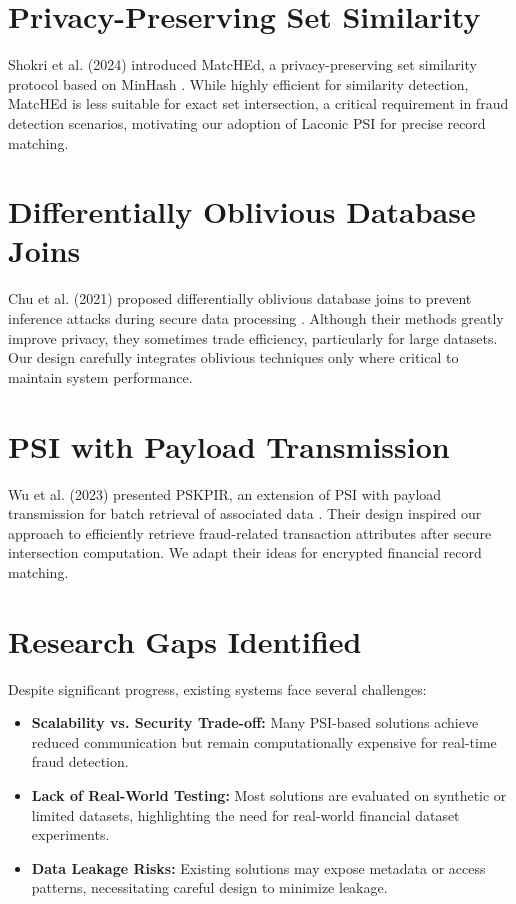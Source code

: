 \section{Privacy-Preserving Set Similarity}

Shokri et al. (2024) introduced MatcHEd, a privacy-preserving set similarity protocol based on MinHash \cite{cryptoeprint:2024/1091}.  
While highly efficient for similarity detection, MatcHEd is less suitable for exact set intersection, a critical requirement in fraud detection scenarios, motivating our adoption of Laconic PSI for precise record matching.

\section{Differentially Oblivious Database Joins}

Chu et al. (2021) proposed differentially oblivious database joins to prevent inference attacks during secure data processing \cite{cryptoeprint:2021/593}.  
Although their methods greatly improve privacy, they sometimes trade efficiency, particularly for large datasets. Our design carefully integrates oblivious techniques only where critical to maintain system performance.

\section{PSI with Payload Transmission}

Wu et al. (2023) presented PSKPIR, an extension of PSI with payload transmission for batch retrieval of associated data \cite{cryptoeprint:2023/1641}.  
Their design inspired our approach to efficiently retrieve fraud-related transaction attributes after secure intersection computation. We adapt their ideas for encrypted financial record matching.

\section{Research Gaps Identified}

Despite significant progress, existing systems face several challenges:

\begin{itemize}
    \item \textbf{Scalability vs. Security Trade-off:} Many PSI-based solutions achieve reduced communication but remain computationally expensive for real-time fraud detection.
    \item \textbf{Lack of Real-World Testing:} Most solutions are evaluated on synthetic or limited datasets, highlighting the need for real-world financial dataset experiments.
    \item \textbf{Data Leakage Risks:} Existing solutions may expose metadata or access patterns, necessitating careful design to minimize leakage.
\end{itemize}

